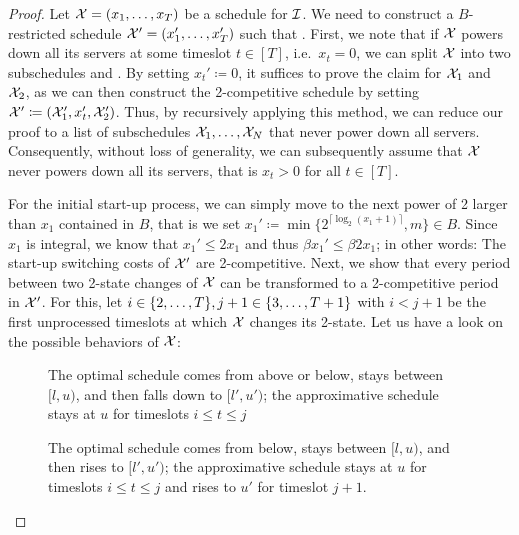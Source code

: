 \begin{proof}
Let $\mathcal{X}=(x_1,\dotsc,x_T)$ be a schedule for $\mathcal{I}$. We need to construct a $B$-restricted schedule $\mathcal{X}'=(x_1',\dotsc,x_T')$ such that .
First, we note that if $\mathcal{X}$ powers down all its servers at some timeslot $t\in[T]$, i.e.\ $x_t=0$, we can split $\mathcal{X}$ into two subschedules  and . By setting $x_t'\coloneqq0$, it suffices to prove the claim for $\mathcal{X}_1$ and $\mathcal{X}_2$, as we can then construct the 2-competitive schedule by setting $\mathcal{X}'\coloneqq(\mathcal{X}_1',x_t',\mathcal{X}_2')$. Thus, by recursively applying this method, we can reduce our proof to a list of subschedules $\mathcal{X}_1,\dotsc,\mathcal{X}_N$ that never power down all servers. Consequently, without loss of generality, we can subsequently assume that $\mathcal{X}$ never powers down all its servers, that is $x_t>0$ for all $t\in[T]$. 
	
For the initial start-up process, we can simply move to the next power of 2 larger than $x_1$ contained in $B$, that is we set $x_1'\coloneqq\min\{2^{\lceil\log_2(x_1+1)\rceil},m\}\in B$. Since $x_1$ is integral, we know that $x_1'\le2x_1$ and thus $\beta x_1'\le\beta 2x_1$; in other words: The start-up switching costs of $\mathcal{X}'$ are 2-competitive. Next, we show that every period between two 2-state changes of $\mathcal{X}$ can be transformed to a 2-competitive period in $\mathcal{X}'$. For this, let $i\in\{2,\dotsc,T\},j+1\in\{3,\dotsc,T+1\}$ with $i<j+1$ be the first unprocessed timeslots at which $\mathcal{X}$ changes its 2-state. Let us have a look on the possible behaviors of $\mathcal{X}$:

\begin{figure}[H]
\captionsetup[subfigure]{labelformat=empty}
\begin{subfigure}[b]{0.49\textwidth}

\end{subfigure}
\hfill
\begin{subfigure}[b]{0.49\textwidth}

\end{subfigure}
\caption{The optimal schedule comes from above or below, stays between $[l,u)$, and then falls down to $[l',u')$; the approximative schedule stays at $u$ for timeslots $i\le t\le j$}
\end{figure}

\begin{figure}[H]
\centering
	
\caption{The optimal schedule comes from below, stays between $[l,u)$, and then rises to $[l',u')$; the approximative schedule stays at $u$ for timeslots $i\le t\le j$ and rises to $u'$ for timeslot $j+1$.}
\end{figure}


\end{proof}
